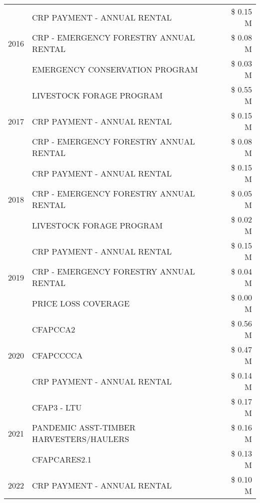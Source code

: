 \begin{tabular}{llr}
\cline{1-3}
\multirow[t]{3}{*}{2016} & CRP PAYMENT - ANNUAL RENTAL & \$ 0.15 M \\
 & CRP - EMERGENCY FORESTRY ANNUAL RENTAL & \$ 0.08 M \\
 & EMERGENCY CONSERVATION PROGRAM & \$ 0.03 M \\
\cline{1-3}
\multirow[t]{3}{*}{2017} & LIVESTOCK FORAGE PROGRAM & \$ 0.55 M \\
 & CRP PAYMENT - ANNUAL RENTAL & \$ 0.15 M \\
 & CRP - EMERGENCY FORESTRY ANNUAL RENTAL & \$ 0.08 M \\
\cline{1-3}
\multirow[t]{3}{*}{2018} & CRP PAYMENT - ANNUAL RENTAL & \$ 0.15 M \\
 & CRP - EMERGENCY FORESTRY ANNUAL RENTAL & \$ 0.05 M \\
 & LIVESTOCK FORAGE PROGRAM & \$ 0.02 M \\
\cline{1-3}
\multirow[t]{3}{*}{2019} & CRP PAYMENT - ANNUAL RENTAL & \$ 0.15 M \\
 & CRP - EMERGENCY FORESTRY ANNUAL RENTAL & \$ 0.04 M \\
 & PRICE LOSS COVERAGE & \$ 0.00 M \\
\cline{1-3}
\multirow[t]{3}{*}{2020} & CFAPCCA2 & \$ 0.56 M \\
 & CFAPCCCCA & \$ 0.47 M \\
 & CRP PAYMENT - ANNUAL RENTAL & \$ 0.14 M \\
\cline{1-3}
\multirow[t]{3}{*}{2021} & CFAP3 - LTU & \$ 0.17 M \\
 & PANDEMIC ASST-TIMBER HARVESTERS/HAULERS & \$ 0.16 M \\
 & CFAPCARES2.1 & \$ 0.13 M \\
\cline{1-3}
2022 & CRP PAYMENT - ANNUAL RENTAL & \$ 0.10 M \\
\cline{1-3}
\bottomrule
\end{tabular}
